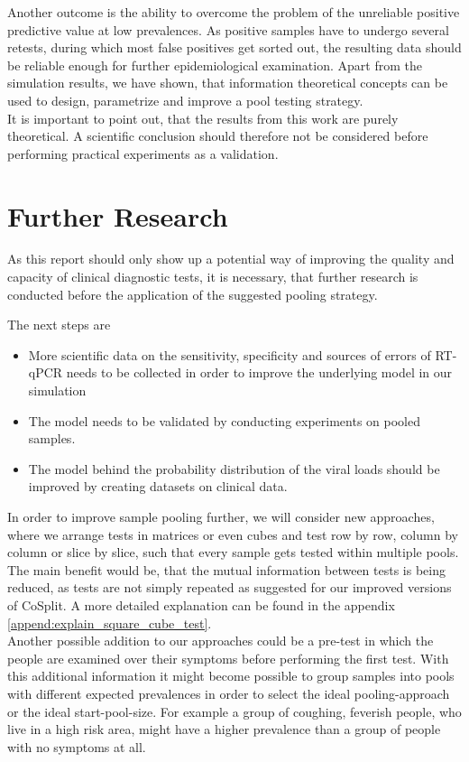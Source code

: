 \documentclass[fleqn,10pt]{wlscirep}
\begin{document}
	Another outcome is the ability to overcome the problem of the unreliable positive predictive value at low prevalences. As positive samples have to undergo several retests, during which most false positives get sorted out, the resulting data should be reliable enough for further epidemiological examination. Apart from the simulation results, we have shown, that information theoretical concepts can be used to design, parametrize and improve a pool testing strategy.\\
	
	It is important to point out, that the results from this work are purely theoretical. A scientific conclusion should therefore not be considered before performing practical experiments as a validation. 
	
	
	
	
	\section{Further Research}
	As this report should only show up a potential way of improving the quality and capacity of clinical diagnostic tests, it is necessary, that further research is conducted before the application of the suggested pooling strategy. 
	
	The next steps are
	\begin{itemize}
		\item More scientific data on the sensitivity, specificity and sources of errors of RT-qPCR needs to be collected in order to improve the underlying model in our simulation
		\item The model needs to be validated by conducting experiments on pooled samples.
		\item The model behind the probability distribution of the viral loads should be improved by creating datasets on clinical data.
	\end{itemize}
	
	In order to improve sample pooling further, we will consider new approaches, where we arrange tests in matrices or even cubes and test row by row, column by column or slice by slice, such that every sample gets tested within multiple pools. The main benefit would be, that the mutual information between tests is being reduced, as tests are not simply repeated as suggested for our improved versions of CoSplit. A more detailed explanation can be found in the appendix \ref{append:explain_square_cube_test}.\\
	
	Another possible addition to our approaches could be a pre-test in which the people are examined over their symptoms before performing the first test. With this additional information it might become possible to group samples into pools with different expected prevalences in order to select the ideal pooling-approach or the ideal start-pool-size. For example a group of coughing, feverish people, who live in a high risk area, might have a higher prevalence than a group of people with no symptoms at all. \\
	
\end{document}
